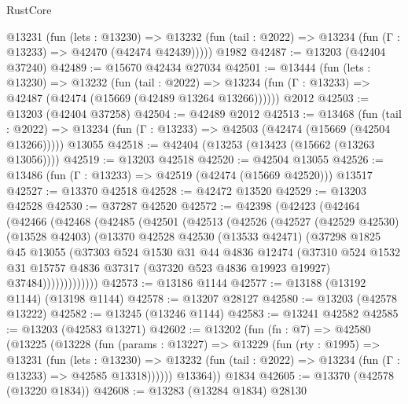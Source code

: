 \begin{lexlean}{RustCore}
\begin{coremodule}
    @13231
      (fun (lets : @13230) =>
      @13232 (fun (tail : @2022) => @13234 (fun (Γ : @13233) => @42470 (@42474 @42439)))))
    @1982
@42487 := @13203 (@42404 @37240)
@42489 := @15670 @42434 @27034
@42501 := @13444
    (fun (lets : @13230) =>
    @13232
      (fun (tail : @2022) =>
      @13234 (fun (Γ : @13233) => @42487 (@42474 (@15669 (@42489 @13264 @13266))))))
    @2012
@42503 := @13203 (@42404 @37258)
@42504 := @42489 @2012
@42513 := @13468
    (fun (tail : @2022) => @13234 (fun (Γ : @13233) => @42503 (@42474 (@15669 (@42504 @13266)))))
    @13055
@42518 := @42404 (@13253 (@13423 (@15662 (@13263 @13056))))
@42519 := @13203 @42518
@42520 := @42504 @13055
@42526 := @13486 (fun (Γ : @13233) => @42519 (@42474 (@15669 @42520))) @13517
@42527 := @13370 @42518
@42528 := @42472 @13520
@42529 := @13203 @42528
@42530 := @37287 @42520
@42572 := @42398
    (@42423
      (@42464
        (@42466
          (@42468
            (@42485
              (@42501
                (@42513
                  (@42526
                    (@42527
                      (@42529 @42530)
                      (@13528 @42403)
                      (@13370
                        @42528
                        @42530
                        (@13533 @42471)
                        (@37298
                          @1825
                          @45
                          @13055
                          (@37303
                            @524
                            @1530
                            @31
                            @44
                            @4836
                            @12474
                            (@37310
                              @524
                              @1532
                              @31
                              @15757
                              @4836
                              @37317
                              (@37320 @523 @4836 @19923 @19927)
                              @37484)))))))))))))
@42573 := @13186 @1144
@42577 := @13188 (@13192 @1144) (@13198 @1144)
@42578 := @13207 @28127
@42580 := @13203 (@42578 @13222)
@42582 := @13245 (@13246 @1144)
@42583 := @13241 @42582
@42585 := @13203 (@42583 @13271)
@42602 := @13202
    (fun (fn : @7) =>
    @42580
      (@13225
        (@13228
          (fun (params : @13227) =>
          @13229
            (fun (rty : @1995) =>
            @13231
              (fun (lets : @13230) =>
              @13232 (fun (tail : @2022) => @13234 (fun (Γ : @13233) => @42585 @13318))))))
        @13364))
    @1834
@42605 := @13370 (@42578 (@13220 @1834))
@42608 := @13283 (@13284 @1834) @28130

\end{coremodule}
\end{lexlean}
